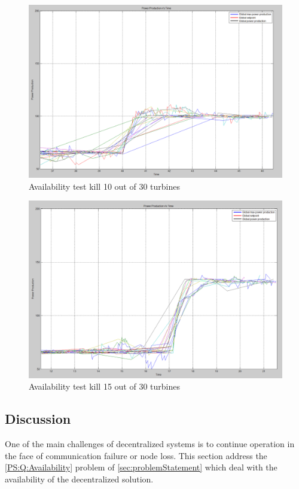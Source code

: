 \begin{figure}
	\centering
	\includegraphics[width=\resultsFigureWidthScale\textwidth]{figures/Results/availabilitytest30-20_setpoint_2000.PNG}
	\caption{Availability test kill 10 out of 30 turbines}
	\label{fig:exp:availability_kill10}
\end{figure}

\begin{figure}
	\centering
	\includegraphics[width=\resultsFigureWidthScale\textwidth]{figures/Results/availabilitytest30-15_setpoint_2000.PNG}
	\caption{Availability test kill 15 out of 30 turbines}
	\label{fig:exp:availability_kill15}
\end{figure}


\subsection{Discussion}
One of the main challenges of decentralized systems is to continue operation in the face of communication failure or node loss. This section address the \ref{PS:Q:Availability} problem of \cref{sec:problemStatement} which deal with the availability of the decentralized solution.

